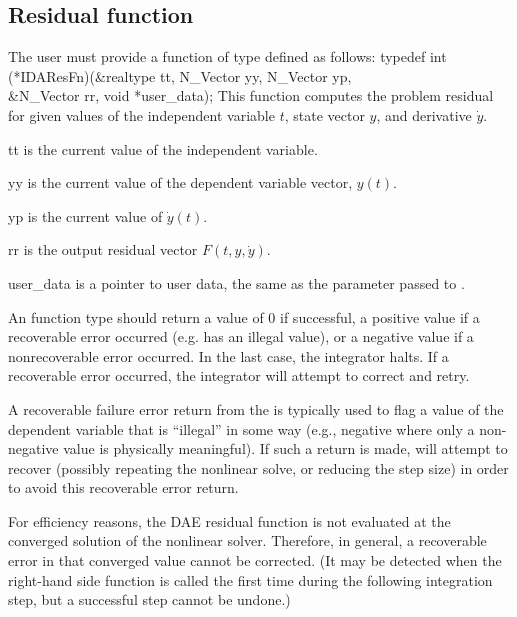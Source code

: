 {\subsection{Residual function}\label{ss:resFn}
The user must provide a function of type  defined as follows:
{
  typedef int (*IDAResFn)(&realtype tt, N\_Vector yy, N\_Vector yp,  \\
                          &N\_Vector rr, void *user\_data);
}
{
  This function computes the problem residual for given values
  of the independent variable $t$, state vector $y$, and derivative $\dot{y}$.
}
{
  \begin{args}
  \item[tt]
    is the current value of the independent variable.
  \item[yy]
    is the current value of the dependent variable vector, $y(t)$.
  \item[yp]
    is the current value of $\dot{y}(t)$.
  \item[rr]
    is the output residual vector $F(t,y,\dot{y})$.
  \item[user\_data]
    is a pointer to user data, the same as the 
    parameter passed to .
  \end{args}
}
{
  An  function type should return a value of $0$ if successful,
  a positive value if a recoverable error occurred (e.g.  has an illegal
  value), or a negative value if a nonrecoverable error occurred.
  In the last case, the integrator halts.
  If a recoverable error occurred, the integrator will attempt to correct and retry.
}
{
  A recoverable failure error return from the  is typically used to
  flag a value of the dependent variable  that is ``illegal'' in
  some way (e.g., negative where only a non-negative value is physically
  meaningful).  If such a return is made, {\ida} will attempt to recover
  (possibly repeating the nonlinear solve, or reducing the step size)
  in order to avoid this recoverable error return.

  For efficiency reasons, the DAE residual function is not evaluated
  at the converged solution of the nonlinear solver. Therefore, in general, a
  recoverable error in that converged value cannot be corrected.  (It may be
  detected when the right-hand side function is called the first time during
  the following integration step, but a successful step cannot be undone.)

}}
